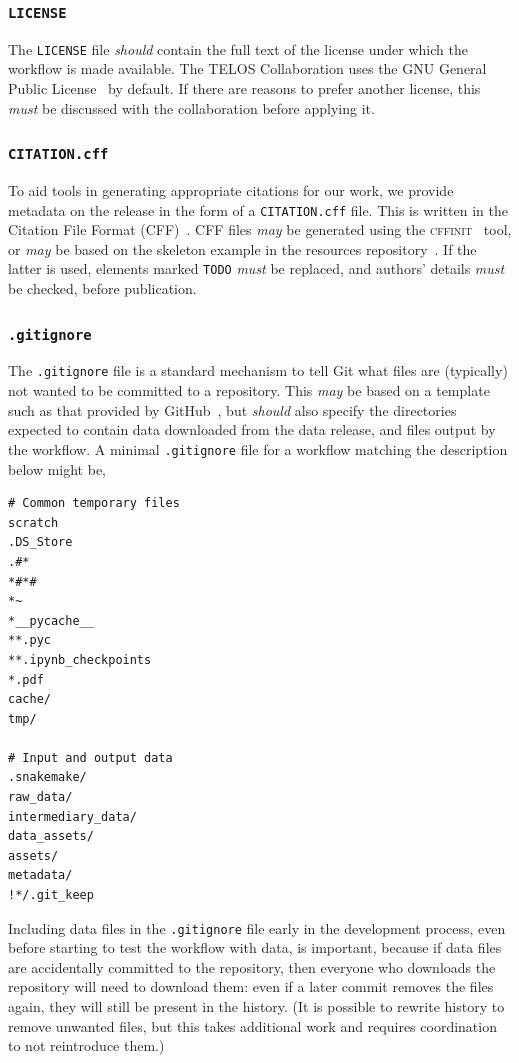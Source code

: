 \documentclass{article}
\newcommand\rfcword[1]{\emph{#1}\xspace}
\newcommand\must{\rfcword{must}}
\newcommand\should{\rfcword{should}}
\newcommand\may{\rfcword{may}}
\newcommand\filename[1]{\texttt{#1}\xspace}
\newcommand\program[1]{\textsc{#1}\xspace}
\begin{document}
\subsubsection{\filename{LICENSE}}

The \filename{LICENSE} file \should contain
the full text of the license under which the workflow is made available.
The TELOS Collaboration uses the GNU General Public License~\cite{gpl} by default.
If there are reasons to prefer another license,
this \must be discussed with the collaboration before applying it.

\subsubsection{\filename{CITATION.cff}}

To aid tools in generating appropriate citations for our work,
we provide metadata on the release in the form of a \filename{CITATION.cff} file.
This is written in the Citation File Format (CFF)~\cite{cff}.
CFF files \may be generated using the \program{cffinit}~\cite{cff-init} tool,
or \may be based on the skeleton example in the resources repository~\cite{resources}.
If the latter is used,
elements marked \verb|TODO| \must be replaced,
and authors' details \must be checked,
before publication.

\subsubsection{\filename{.gitignore}}

The \filename{.gitignore} file is a standard mechanism to tell Git
what files are
(typically)
not wanted to be committed to a repository.
This \may be based on a template such as that provided by GitHub~\cite{gitignore-python},
but \should also specify the directories expected to contain
data downloaded from the data release,
and files output by the workflow.
A minimal \filename{.gitignore} file for a workflow matching the description below might be,

\begin{verbatim}
# Common temporary files
scratch
.DS_Store
.#*
*#*#
*~
*__pycache__
**.pyc
**.ipynb_checkpoints
*.pdf
cache/
tmp/

# Input and output data
.snakemake/
raw_data/
intermediary_data/
data_assets/
assets/
metadata/
!*/.git_keep
\end{verbatim}

Including data files in the \filename{.gitignore} file early in the development process,
even before starting to test the workflow with data,
is important,
because if data files are accidentally committed to the repository,
then everyone who downloads the repository will need to download them:
even if a later commit removes the files again,
they will still be present in the history.
(It is possible to rewrite history to remove unwanted files,
but this takes additional work and requires coordination to not reintroduce them.)
\end{document}
